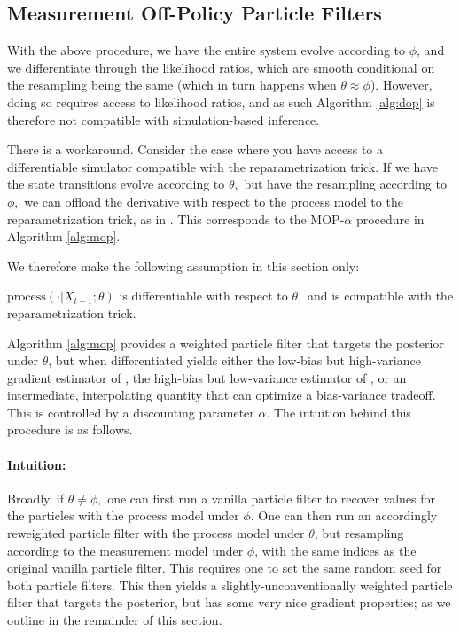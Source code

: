 \documentclass{article}
\begin{document}
\subsection{Measurement Off-Policy Particle Filters}

With the above procedure, we have the entire system evolve according to $\phi$, and we differentiate through the likelihood ratios, which are smooth conditional on the resampling being the same (which in turn happens when $\theta \approx \phi$). However, doing so requires access to likelihood ratios, and as such Algorithm \ref{alg:dop} is therefore not compatible with simulation-based inference. 

There is a workaround. Consider the case where you have access to a differentiable simulator compatible with the reparametrization trick. If we have the state transitions evolve according to $\theta,$ but have the resampling according to $\phi,$ we can offload the derivative with respect to the process model to the reparametrization trick, as in \cite{corenflos21}. This corresponds to the MOP-$\alpha$ procedure in Algorithm \ref{alg:mop}. 

We therefore make the following assumption in this section only:
\begin{aspt}
    $\text{process}(\cdot | X_{t-1}; \theta)$ is differentiable with respect to $\theta,$ and is compatible with the reparametrization trick. 
\end{aspt}

Algorithm \ref{alg:mop} provides a weighted particle filter that targets the posterior under $\theta$, but when differentiated yields either the low-bias but high-variance gradient estimator of \cite{poyiadjis11}, the high-bias but low-variance estimator of \cite{blei2018vsmc}, or an intermediate, interpolating quantity that can optimize a bias-variance tradeoff. This is controlled by a discounting parameter $\alpha$. The intuition behind this procedure is as follows. 

\paragraph{Intuition:} Broadly, if $\theta\neq\phi,$ one can first run a vanilla particle filter to recover values for the particles with the process model under $\phi.$ One can then run an accordingly reweighted particle filter with the process model under $\theta$, but resampling according to the measurement model under $\phi$, with the same indices as the original vanilla particle filter. This requires one to set the same random seed for both particle filters. This then yields a slightly-unconventionally weighted particle filter that targets the posterior, but has some very nice gradient properties; as we outline in the remainder of this section.
\end{document}
